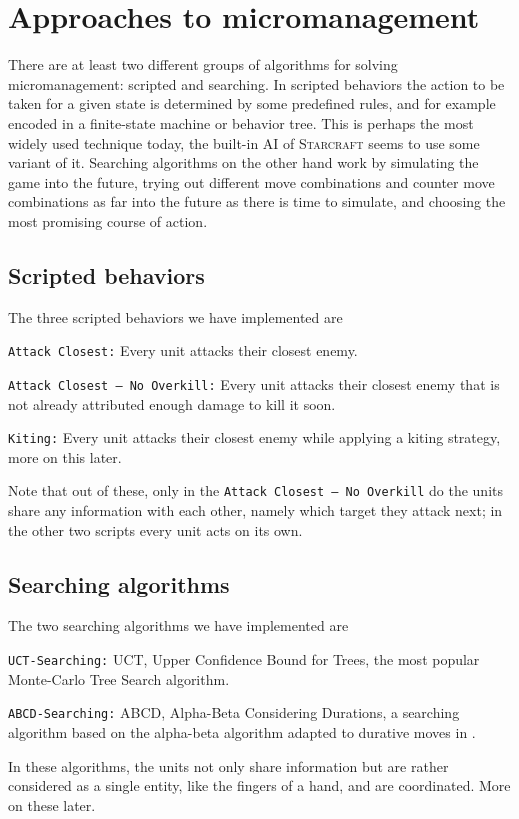 \section{Approaches to micromanagement}
There are at least two different groups of algorithms for solving micromanagement: scripted and searching.
In scripted behaviors the action to be taken for a given state is determined by some predefined rules, and for example encoded in a finite-state machine or behavior tree.
This is perhaps the most widely used technique today, the built-in AI of \textsc{Starcraft} seems to use some variant of it.
Searching algorithms on the other hand work by simulating the game into the future, trying out different move combinations and counter move combinations as far into the future as there is time to simulate, and choosing the most promising course of action.

\subsection{Scripted behaviors}
The three scripted behaviors we have implemented are
\begin{shortitem}
\item \texttt{Attack Closest:}					Every unit attacks their closest enemy.
\item \texttt{Attack Closest -- No Overkill:}	Every unit attacks their closest enemy that is not already attributed enough damage to kill it soon.
\item \texttt{Kiting:}							Every unit attacks their closest enemy while applying a kiting strategy, more on this later.
\end{shortitem}

Note that out of these, only in the \texttt{Attack Closest -- No Overkill} do the units share any information with each other, namely which target they attack next; in the other two scripts every unit acts on its own.

\subsection {Searching algorithms}
The two searching algorithms we have implemented are
\begin{shortitem}
\item \texttt{UCT-Searching:}	UCT, Upper Confidence Bound for Trees, the most popular Monte-Carlo Tree Search algorithm. \cite{mcts}
\item \texttt{ABCD-Searching:}	ABCD, Alpha-Beta Considering Durations, a searching algorithm based on the alpha-beta algorithm adapted to durative moves in \cite{abcd}.
\end{shortitem}
In these algorithms, the units not only share information but are rather considered as a single entity, like the fingers of a hand, and are coordinated.
More on these later.
